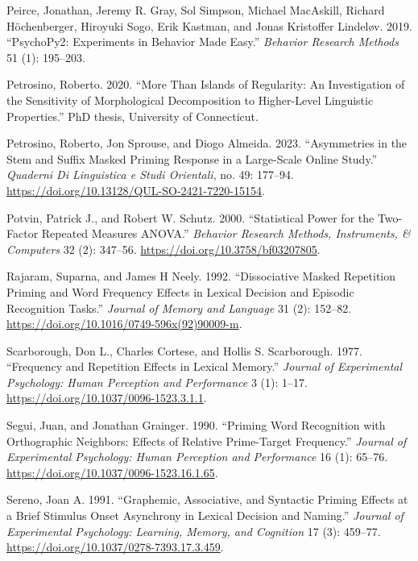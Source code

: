 \documentclass[
]{interact}
\newlength{\cslhangindent}
\newenvironment{CSLReferences}[2] %
 {\begin{list}{}{%
  \setlength{\itemindent}{0pt}
  \setlength{\leftmargin}{0pt}
  \setlength{\parsep}{0pt}
  \ifodd #1
   \setlength{\leftmargin}{\cslhangindent}
   \setlength{\itemindent}{-1\cslhangindent}
  \fi
  \setlength{\itemsep}{#2\baselineskip}}}
 {\end{list}}
\begin{document}
\begin{CSLReferences}{1}{0}
Peirce, Jonathan, Jeremy R. Gray, Sol Simpson, Michael MacAskill,
Richard Höchenberger, Hiroyuki Sogo, Erik Kastman, and Jonas Kristoffer
Lindeløv. 2019. {``PsychoPy2: Experiments in Behavior Made Easy.''}
\emph{Behavior Research Methods} 51 (1): 195--203.

Petrosino, Roberto. 2020. {``More Than Islands of Regularity: An
Investigation of the Sensitivity of Morphological Decomposition to
Higher-Level Linguistic Properties.''} PhD thesis, University of
Connecticut.

Petrosino, Roberto, Jon Sprouse, and Diogo Almeida. 2023. {``Asymmetries
in the Stem and Suffix Masked Priming Response in a Large-Scale Online
Study.''} \emph{Quaderni Di Linguistica e Studi Orientali}, no. 49:
177--94. \url{https://doi.org/10.13128/QUL-SO-2421-7220-15154}.

Potvin, Patrick J., and Robert W. Schutz. 2000. {``Statistical Power for
the Two-Factor Repeated Measures ANOVA.''} \emph{Behavior Research
Methods, Instruments, \& Computers} 32 (2): 347--56.
\url{https://doi.org/10.3758/bf03207805}.

Rajaram, Suparna, and James H Neely. 1992. {``Dissociative Masked
Repetition Priming and Word Frequency Effects in Lexical Decision and
Episodic Recognition Tasks.''} \emph{Journal of Memory and Language} 31
(2): 152--82. \url{https://doi.org/10.1016/0749-596x(92)90009-m}.

Scarborough, Don L., Charles Cortese, and Hollis S. Scarborough. 1977.
{``Frequency and Repetition Effects in Lexical Memory.''} \emph{Journal
of Experimental Psychology: Human Perception and Performance} 3 (1):
1--17. \url{https://doi.org/10.1037/0096-1523.3.1.1}.

Segui, Juan, and Jonathan Grainger. 1990. {``Priming Word Recognition
with Orthographic Neighbors: Effects of Relative Prime-Target
Frequency.''} \emph{Journal of Experimental Psychology: Human Perception
and Performance} 16 (1): 65--76.
\url{https://doi.org/10.1037/0096-1523.16.1.65}.

Sereno, Joan A. 1991. {``Graphemic, Associative, and Syntactic Priming
Effects at a Brief Stimulus Onset Asynchrony in Lexical Decision and
Naming.''} \emph{Journal of Experimental Psychology: Learning, Memory,
and Cognition} 17 (3): 459--77.
\url{https://doi.org/10.1037/0278-7393.17.3.459}.


\end{CSLReferences}
\end{document}
